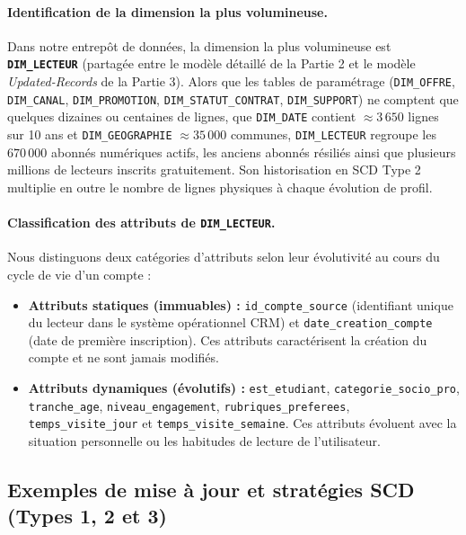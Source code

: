 \documentclass[a4paper,12pt]{article}
\begin{document}
\paragraph{Identification de la dimension la plus volumineuse.}
Dans notre entrepôt de données, la dimension la plus volumineuse est \textbf{\texttt{DIM\_LECTEUR}} (partagée entre le modèle détaillé de la Partie 2 et le modèle \emph{Updated-Records} de la Partie 3). Alors que les tables de paramétrage (\texttt{DIM\_OFFRE}, \texttt{DIM\_CANAL}, \texttt{DIM\_PROMOTION}, \texttt{DIM\_STATUT\_CONTRAT}, \texttt{DIM\_SUPPORT}) ne comptent que quelques dizaines ou centaines de lignes, que \texttt{DIM\_DATE} contient $\approx 3\,650$ lignes sur 10 ans et \texttt{DIM\_GEOGRAPHIE} $\approx 35\,000$ communes, \texttt{DIM\_LECTEUR} regroupe les $670\,000$ abonnés numériques actifs, les anciens abonnés résiliés ainsi que plusieurs millions de lecteurs inscrits gratuitement. Son historisation en SCD Type 2 multiplie en outre le nombre de lignes physiques à chaque évolution de profil.

\paragraph{Classification des attributs de \texttt{DIM\_LECTEUR}.}
Nous distinguons deux catégories d'attributs selon leur évolutivité au cours du cycle de vie d'un compte :
\begin{itemize}
  \item \textbf{Attributs statiques (immuables) :} \texttt{id\_compte\_source} (identifiant unique du lecteur dans le système opérationnel CRM) et \texttt{date\_creation\_compte} (date de première inscription). Ces attributs caractérisent la création du compte et ne sont jamais modifiés.
  \item \textbf{Attributs dynamiques (évolutifs) :} \texttt{est\_etudiant}, \texttt{categorie\_socio\_pro}, \texttt{tranche\_age}, \texttt{niveau\_engagement}, \texttt{rubriques\_preferees}, \texttt{temps\_visite\_jour} et \texttt{temps\_visite\_semaine}. Ces attributs évoluent avec la situation personnelle ou les habitudes de lecture de l'utilisateur.
\end{itemize}

\subsection{Exemples de mise à jour et stratégies SCD (Types 1, 2 et 3)}
\end{document}
